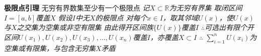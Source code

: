 \documentclass[11pt]{article}
\begin{document}
\textbf{极限点引理} \newline
无穷有界数集至少有一个极限点 \newline
\textit{记$X\subset\mathbb{R}$为无穷有界集 \newline
取闭区间$I=[a,b]$覆盖$X$ \newline
假设$I$中无$X$的极限点 \newline
对每个$x\in I$，取其邻域$U(x)$，使$U(x)$与$X$之交集为空集或非空有限集 \newline
由此得开区间族$\{U(x)\}$覆盖$I$ \newline
$\therefore$可选出有限个开区间$U(x_1),U(x_2),U(x_3),\dots,U(x_n)$覆盖$I$，亦覆盖$X\subset I$ \newline
$\therefore$ $\sum\limits_{i=1}^{n}U(x_i)$为空集或有限集，与包含无穷集$X$矛盾}
\end{document}
